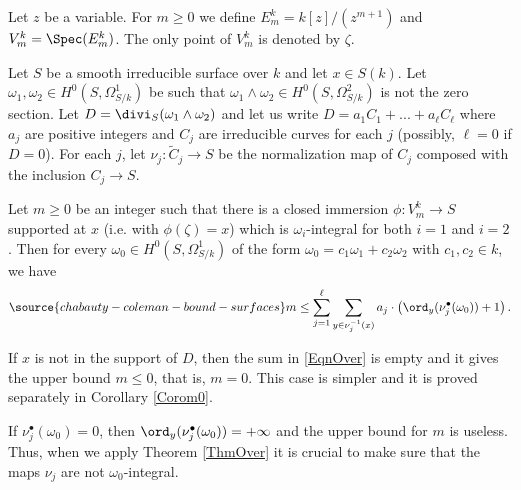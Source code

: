  Let $z$ be a variable. For $m\ge 0$ we define $E_m^k=k[z]/(z^{m+1})$ and $V_m^k = \Spec(E_m^k)$. The only point of $V_m^k$ is denoted by $\zeta$.
\begin{theorem}
\notready \label{ThmOver} Let $S$ be a smooth irreducible surface over $k$ and let $x\in S(k)$. Let $\omega_1,\omega_2\in H^0(S, \Omega^1_{S/k})$ be such that $\omega_1\wedge \omega_2\in H^0(S,\Omega^2_{S/k})$ is not the zero section. Let $D=\divi_S(\omega_1\wedge \omega_2)$ and let us write $D=a_1C_1+...+a_\ell C_\ell$ where $a_j$ are positive integers and $C_j$ are irreducible curves for each $j$ (possibly, $\ell=0$ if $D=0$). For each $j$, let $\nu_j:\widetilde{C}_j\to S$ be the normalization map of $C_j$ composed with the inclusion $C_j\to S$.

Let $m\ge 0$ be an integer such that there is a closed immersion $\phi: V_m^k\to S$ supported at $x$ (i.e. with $\phi(\zeta)=x$) which is $\omega_i$-integral for both $i=1$ and $i=2$. Then for every $\omega_0\in H^0(S,\Omega^1_{S/k})$ of the form $\omega_0=c_1\omega_1+c_2\omega_2$ with $c_1,c_2\in k$, we have
\begin{equation}\label{EqnOver}
\source{chabauty-coleman-bound-surfaces}
m\le \sum_{j=1}^\ell \sum_{y\in \nu_j^{-1}(x)} a_j\cdot \left(\ord_y (\nu_j^\bullet (\omega_0))+1 \right).
\end{equation}
\end{theorem}

\begin{remark}
\notready\label{RmkOver1} If $x$ is not in the support of $D$, then the sum in \eqref{EqnOver} is empty and it gives the upper bound $m\le 0$, that is, $m=0$. This case is simpler and it is proved separately in Corollary \ref{Corom0}.
\end{remark}

\begin{remark}
\notready If $\nu_j^\bullet(\omega_0)=0$, then $\ord_y(\nu_j^\bullet(\omega_0))=+\infty$ and the upper bound for $m$ is useless. Thus, when we apply Theorem \ref{ThmOver} it is crucial to make sure that the maps $\nu_j$ are not $\omega_0$-integral.
\end{remark}

